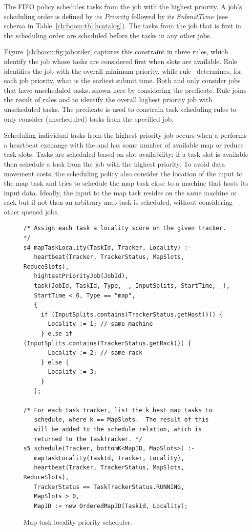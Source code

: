 The FIFO policy schedules tasks from the job with the highest priority.  A
job's scheduling order is defined by its $Priority$ followed by its
$SubmitTime$ (see  schema in Table~\ref{ch:boom:tbl:hcatalog}).  The
tasks from the job that is first in the scheduling order are scheduled before
the tasks in any other jobs.

Figure~\ref{ch:boom:fig:joborder} captures this constraint in three rules,
which identify the job whose tasks are considered first when \TT slots are
available.  Rule  identifies the job with the overall minimum priority,
while rule~ determines, for each job priority, what is the earliest
submit time.  Both  and  only consider jobs that have unscheduled
tasks, shown here by considering the 
predicate.  Rule  joins the result of rules  and  to
identify the overall highest priority job with unscheduled tasks.  The
 predicate is used to constrain task scheduling rules
to only consider (unscheduled) tasks from the specified job.

Scheduling individual tasks from the highest priority job occurs when a \TT
performs a heartbeat exchange with the \JT and has some number of available map
or reduce task slots.  Tasks are scheduled based on slot availability; if a
task slot is available then schedule a task from the job with the highest
priority.  To avoid data movement costs, the scheduling policy also consider
the location of the input to the map task and tries to schedule the map task
close to a machine that hosts its input data.  Ideally, the input to the map
task resides on the same machine or rack but if not then an arbitrary map task
is scheduled, without considering other queued jobs.  

\begin{figure}
\ssp
\centering
\begin{lstlisting}
/* Assign each task a locality score on the given tracker. */
s4 mapTaskLocality(TaskId, Tracker, Locality) :-
   heartbeat(Tracker, TrackerStatus, MapSlots, ReduceSlots),
   hightestPriorityJob(JobId),
   task(JobId, TaskId, Type, _, InputSplits, StartTime, _),
   StartTime < 0, Type == "map",
   {
     if (InputSplits.contains(TrackerStatus.getHost())) { 
       Locality := 1; // same machine
     } else if (InputSplits.contains(TrackerStatus.getRack()) { 
       Locality := 2; // same rack
     } else {
       Locality := 3;
     }
   };
	
/* For each task tracker, list the k best map tasks to 
   schedule, where k == MapSlots.  The result of this 
   will be added to the schedule relation, which is 
   returned to the TaskTracker. */
s5 schedule(Tracker, bottomK<MapID, MapSlots>) :-
   mapTaskLocality(TaskId, Tracker, Locality),
   heartbeat(Tracker, TrackerStatus, MapSlots, ReduceSlots),
   TrackerStatus == TaskTrackerStatus.RUNNING,
   MapSlots > 0,
   MapID := new OrderedMapID(TaskId, Locality);

\end{lstlisting}
\caption{\label{ch:boom:fig:schedule} Map task locality priority scheduler.}
\end{figure}

